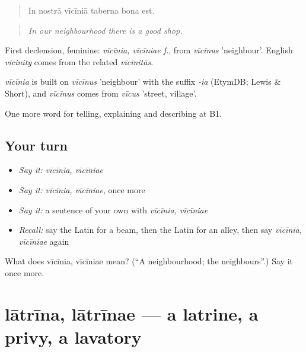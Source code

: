 \begin{quote}
In nostrā vīcīniā taberna bona est.
\end{quote}

\begin{quote}
\emph{In our neighbourhood there is a good shop.}
\end{quote}

First declension, feminine: \emph{vīcīnia, vīcīniae f.}, from \emph{vīcīnus} 'neighbour'. English \emph{vicinity} comes from the related \emph{vīcīnitās}.

\begin{cousinweb}
\emph{vīcīnia} is built on \emph{vīcīnus} 'neighbour' with the suffix \emph{-ia} (EtymDB; Lewis \& Short), and \emph{vīcīnus} comes from \emph{vīcus} 'street, village'.
\end{cousinweb}

\begin{grammarlens}[title={What you've built}]
One more word for telling, explaining and describing at B1.
\end{grammarlens}

\subsection*{Your turn}
\begin{itemize}
\raggedright
  \item \emph{Say it:} \emph{vīcīnia, vīcīniae}
  \item \emph{Say it:} \emph{vīcīnia, vīcīniae}, once more
  \item \emph{Say it:} a sentence of your own with \emph{vīcīnia, vīcīniae}
  \item \emph{Recall:} say the Latin for a beam, then the Latin for an alley, then say \emph{vīcīnia, vīcīniae} again
\end{itemize}

\begin{tcolorbox}[breakable,colback=teal!4,colframe=teal!35!black,title={Before you move on}]
What does vīcīnia, vīcīniae mean? (\textquotedblleft{}A neighbourhood; the neighbours\textquotedblright{}.) Say it once more.
\end{tcolorbox}
\section[lātrīna, lātrīnae]{lātrīna, lātrīnae — a latrine, a privy, a lavatory}

\label{lesson:LA-C458-latrina}



